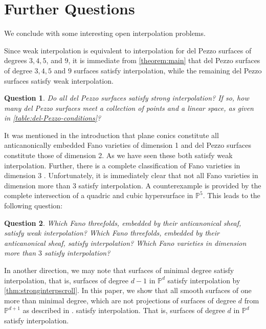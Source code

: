 \documentclass[reqno, 11pt]{amsart}
\newtheorem{question}{Question}
\theoremstyle{definition}
\theoremstyle{remark}
\numberwithin{equation}{section}
\numberwithin{thm}{section}
\numberwithin{prop}{section}
\numberwithin{lem}{section}
\numberwithin{cor}{section}
\numberwithin{conj}{section}
\numberwithin{defn}{section}
\theoremstyle{plain}
\theoremstyle{definition}
\newcommand\bp{{\mathbb P}}
\begin{document}
\section{Further Questions} 
\label{sec:questions}

We conclude with some interesting open interpolation problems.

Since weak interpolation is equivalent to interpolation
for del Pezzo surfaces of degrees $3,4,5$, and $9$,
it is immediate from \autoref{theorem:main} that 
del Pezzo surfaces of degree $3, 4, 5$ and $9$ surfaces satisfy interpolation,
while the remaining del Pezzo surfaces satisfy weak interpolation.

\begin{question}
	\label{question:}
	Do all del Pezzo surfaces satisfy strong interpolation?
	If so, how many del Pezzo surfaces meet
	a collection of points and a linear space,
	as given in \autoref{table:del-Pezzo-conditions}?
\end{question}

It was mentioned in the introduction that plane conics
constitute all anticanonically embedded Fano varieties of dimension 1 and
del Pezzo surfaces constitute those of dimension 2.
As we have seen these both satisfy weak interpolation.
Further, there is a complete classification of Fano
varieties in dimension 3 \cite{iskovskikhP:fano-varieties}. 
Unfortunately, it is immediately clear that not all
Fano varieties in dimension more than 3 satisfy interpolation.
A counterexample is provided by the complete intersection of
a quadric and cubic hypersurface in $\bp^5$. 
This leads to the following question:
\begin{question}
	\label{question:}
	Which Fano threefolds, embedded by their
	anticanonical sheaf, satisfy weak interpolation?
	Which Fano threefolds, embedded by their anticanonical sheaf,
	satisfy interpolation? Which Fano varieties in dimension more than $3$ satisfy
	interpolation?
\end{question}

In another direction, we may note that surfaces of minimal degree satisfy
interpolation, that is, surfaces of degree $d-1$ in $\bp^d$ satisfy
interpolation by \autoref{thm:stronginterpscroll}.
In this paper, we show that all smooth surfaces of one more than minimal
degree, which are not projections of surfaces of degree $d$ from $\bp^{d+1}$ 
as described in \cite[Theorem 2.5]{coskun:the-enumerative-geometry-of-del-Pezzo-surfaces-via-degenerations}.
satisfy interpolation. That is, surfaces of degree $d$ in $\bp^d$ satisfy interpolation. 
\end{document}
